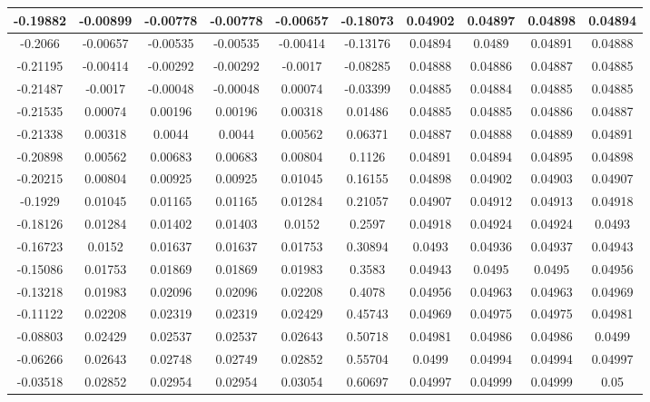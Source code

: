 \begin{table}
\begin{center}
\begin{tabular}{c|c|c|c|c|c|c|c|c|c}
			\hline
			-0.19882 & -0.00899 & -0.00778 & -0.00778 & -0.00657 & -0.18073 & 0.04902 & 0.04897 & 0.04898 & 0.04894 \\
			\hline
			-0.2066 & -0.00657 & -0.00535 & -0.00535 & -0.00414 & -0.13176 & 0.04894 & 0.0489 & 0.04891 & 0.04888 \\
			\hline
			-0.21195 & -0.00414 & -0.00292 & -0.00292 & -0.0017 & -0.08285 & 0.04888 & 0.04886 & 0.04887 & 0.04885 \\
			\hline
			-0.21487 & -0.0017 & -0.00048 & -0.00048 & 0.00074 & -0.03399 & 0.04885 & 0.04884 & 0.04885 & 0.04885 \\
			\hline
			-0.21535 & 0.00074 & 0.00196 & 0.00196 & 0.00318 & 0.01486 & 0.04885 & 0.04885 & 0.04886 & 0.04887 \\
			\hline
			-0.21338 & 0.00318 & 0.0044 & 0.0044 & 0.00562 & 0.06371 & 0.04887 & 0.04888 & 0.04889 & 0.04891 \\
			\hline
			-0.20898 & 0.00562 & 0.00683 & 0.00683 & 0.00804 & 0.1126 & 0.04891 & 0.04894 & 0.04895 & 0.04898 \\
			\hline
			-0.20215 & 0.00804 & 0.00925 & 0.00925 & 0.01045 & 0.16155 & 0.04898 & 0.04902 & 0.04903 & 0.04907 \\
			\hline
			-0.1929 & 0.01045 & 0.01165 & 0.01165 & 0.01284 & 0.21057 & 0.04907 & 0.04912 & 0.04913 & 0.04918 \\
			\hline
			-0.18126 & 0.01284 & 0.01402 & 0.01403 & 0.0152 & 0.2597 & 0.04918 & 0.04924 & 0.04924 & 0.0493 \\
			\hline
			-0.16723 & 0.0152 & 0.01637 & 0.01637 & 0.01753 & 0.30894 & 0.0493 & 0.04936 & 0.04937 & 0.04943 \\
			\hline
			-0.15086 & 0.01753 & 0.01869 & 0.01869 & 0.01983 & 0.3583 & 0.04943 & 0.0495 & 0.0495 & 0.04956 \\
			\hline
			-0.13218 & 0.01983 & 0.02096 & 0.02096 & 0.02208 & 0.4078 & 0.04956 & 0.04963 & 0.04963 & 0.04969 \\
			\hline
			-0.11122 & 0.02208 & 0.02319 & 0.02319 & 0.02429 & 0.45743 & 0.04969 & 0.04975 & 0.04975 & 0.04981 \\
			\hline
			-0.08803 & 0.02429 & 0.02537 & 0.02537 & 0.02643 & 0.50718 & 0.04981 & 0.04986 & 0.04986 & 0.0499 \\
			\hline
			-0.06266 & 0.02643 & 0.02748 & 0.02749 & 0.02852 & 0.55704 & 0.0499 & 0.04994 & 0.04994 & 0.04997 \\
			\hline
			-0.03518 & 0.02852 & 0.02954 & 0.02954 & 0.03054 & 0.60697 & 0.04997 & 0.04999 & 0.04999 & 0.05 \\

\end{tabular}
\end{center}
\end{table}
